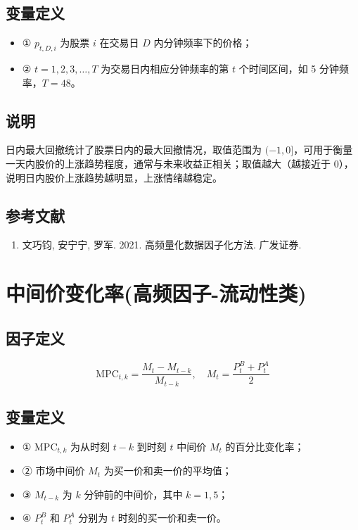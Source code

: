 \documentclass{article}
\begin{document}
\subsection{变量定义}
\begin{itemize}
    \item ① \( p_{t,D,i} \) 为股票 \( i \) 在交易日 \( D \) 内分钟频率下的价格；
    \item ② \( t = 1,2,3,\ldots,T \) 为交易日内相应分钟频率的第 \( t \) 个时间区间，如 5 分钟频率，\( T=48 \)。
\end{itemize}

\subsection{说明}
日内最大回撤统计了股票日内的最大回撤情况，取值范围为 \((-1,0]\)，可用于衡量一天内股价的上涨趋势程度，通常与未来收益正相关；取值越大（越接近于 0），说明日内股价上涨趋势越明显，上涨情绪越稳定。

\subsection{参考文献}
\begin{enumerate}
    \item 文巧钧, 安宁宁, 罗军. 2021. 高频量化数据因子化方法. 广发证券.
\end{enumerate}

\section{中间价变化率(高频因子-流动性类)}

\subsection{因子定义}
\begin{equation}
    \mathrm{MPC}_{t,k} = \frac{M_t - M_{t-k}}{M_{t-k}}, \quad M_t = \frac{P_t^B + P_t^A}{2}
\end{equation}

\subsection{变量定义}
\begin{itemize}
    \item ① \( \mathrm{MPC}_{t,k} \) 为从时刻 \( t-k \) 到时刻 \( t \) 中间价 \( M_t \) 的百分比变化率；
    \item ② 市场中间价 \( M_t \) 为买一价和卖一价的平均值；
    \item ③ \( M_{t-k} \) 为 \( k \) 分钟前的中间价，其中 \( k = 1, 5 \)；
    \item ④ \( P_t^B \) 和 \( P_t^A \) 分别为 \( t \) 时刻的买一价和卖一价。
\end{itemize}
\end{document}

